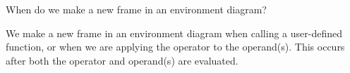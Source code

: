 \begin{blocksection}
\question When do we make a new frame in an environment diagram?

\begin{solution}[0.5in]
We make a new frame in an environment diagram when calling a user-defined function, or when we are applying the operator to the operand(s). This occurs after both the operator and operand(s) are evaluated.
\end{solution}
\end{blocksection}
